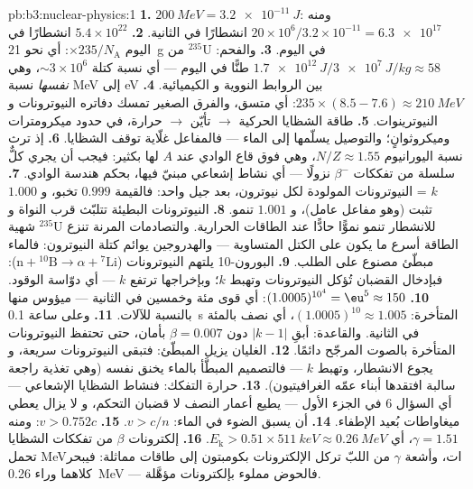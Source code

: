 \begin{solution}{pb:b3:nuclear-physics:1}
\textbf{1.} $\qty{200}{MeV} = \qty{3.2e-11}{J}$:
ومنه $20\times10^6/3.2\times10^{-11} = \qty{6.3e17}{}$ انشطارًا في
الثانية.
\textbf{2.} $5.4\times10^{22}$ انشطارًا في اليوم $\times
235/N_{\text{A}}$: أي نحو \qty{21}{g} من $^{235}$U في اليوم.
\textbf{3.} والفحم: $\qty{1.7e12}{J}/\qty{3e7}{J/kg} \approx 58$
طنًّا في اليوم --- أي نسبة كتلة $\sim3\times10^{6}$، وهي
\emph{نفسها} نسبة \unit{MeV} إلى \unit{eV} بين الروابط النووية و
الكيميائية.
\textbf{4.} $235\times(8.5 - 7.6) \approx \qty{210}{MeV}$:
أي متسق، والفرق الصغير تمسك دفاتره النيوترونات و
النيوترينوات.
\textbf{5.} طاقة الشظايا الحركية $\to$ تأيّن $\to$ حرارة،
في حدود ميكرومترات وميكروثوانٍ؛ والتوصيل يسلّمها إلى
الماء --- فالمفاعل غلّاية توقف الشظايا.
\textbf{6.} إذ ترث نسبة اليورانيوم $N/Z \approx 1.55$، وهي فوق
قاع الوادي عند $A$ لها بكثير: فيجب أن يجري كلٌّ سلسلة من
تفككات $\beta^-$ نزولًا --- أي نشاط إشعاعي مبنيّ فيها، بحكم
هندسة الوادي.
\textbf{7.} $k$ = النيوترونات المولودة لكل نيوترون، بعد جيل
واحد: فالقيمة $0.999$ تخبو، و $1.000$ تثبت (وهو مفاعل
عامل)، و $1.001$ تنمو.
\textbf{8.} النيوترونات البطيئة تتلبّث قرب النواة و
شهية $^{235}$U للانشطار تنمو نموًّا حادًّا عند الطاقات الحرارية.
والتصادمات المرنة تنزع الطاقة أسرع ما يكون على الكتل المتساوية ---
والهدروجين يوائم كتلة النيوترون: فالماء مبطّئ
مصنوع على الطلب.
\textbf{9.} البورون-10 يلتهم النيوترونات ($\text{n} + {}^{10}
\text{B} \to \alpha + {}^{7}\text{Li}$): فبإدخال القضبان تُؤكل
النيوترونات وتهبط $k$؛ وبإخراجها ترتفع $k$ --- أي دوّاسة الوقود.
\textbf{10.} $(1.0005)^{10^4} = \eu^{5} \approx 150$: أي قوى
مئة وخمسين في الثانية --- ميؤوس منها بالنسبة للآلات.
\textbf{11.} وعلى ساعة \qty{0.1}{s} المتأخرة:
$(1.0005)^{10} \approx 1.005$، أي نصف بالمئة في الثانية. والقاعدة:
أبقِ $|k - 1|$ دون $\beta = 0.007$ بأمان، حتى تحتفظ النيوترونات
المتأخرة بالصوت المرجّح دائمًا.
\textbf{12.} الغليان يزيل المبطّئ: فتبقى النيوترونات سريعة، و
يجوع الانشطار، وتهبط $k$ --- فالتصميم المبطَّأ بالماء
يخنق نفسه (وهي تغذية راجعة سالبة افتقدها أبناء عمّه الغرافيتيون).
\textbf{13.} حرارة التفكك: فنشاط الشظايا الإشعاعي ---
أي السؤال 6 في الجزء الأول --- يطيع أعمار النصف لا قضبان التحكم، و
لا يزال يعطي ميغاواطات بُعيد الإطفاء.
\textbf{14.} أن يسبق الضوء في الماء: $v > c/n$.
\textbf{15.} $v > 0.752c$: ومنه $\gamma = 1.51$، أي $E_{\text{k}} >
0.51\times\qty{511}{keV} \approx \qty{0.26}{MeV}$.
\textbf{16.} إلكترونات $\beta$ من تفككات الشظايا تحمل
\unit{MeV}ات، وأشعة $\gamma$ من اللبّ تركل الإلكترونات بكومبتون إلى
طاقات مماثلة: فيبحر كلاهما وراء \qty{0.26}{MeV} --- فالحوض
مملوء بإلكترونات مؤهَّلة.

\end{solution}
